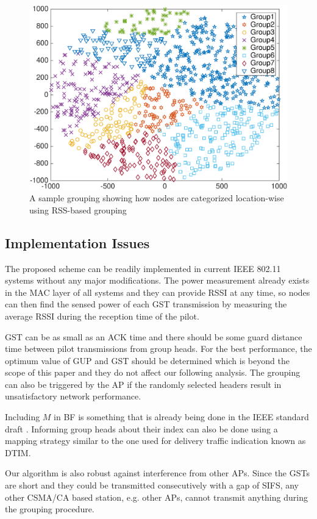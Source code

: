 \begin{figure} [!tbp]
  \centering
  \includegraphics[width=.95\textwidth]{figures/sample_vonoroli}
  \caption{A sample grouping showing how nodes are categorized location-wise using RSS-based grouping}
  \label{fig:samplevonoroli}
\end{figure}


\subsection{Implementation Issues}
The proposed scheme can be readily implemented in current IEEE 802.11 systems without any major modifications. The power measurement already exists in the MAC layer of all systems and they can provide RSSI at any time, so nodes can then find the sensed power of each GST transmission by measuring the average RSSI during the reception time of the pilot. 

GST can be as small as an ACK time and there should be some guard distance time between pilot transmissions from group heads. For the best performance, the optimum value of GUP and GST should be determined which is beyond the scope of this paper and they do not affect our following analysis. The grouping can also be triggered by the AP if the randomly selected headers result in unsatisfactory network performance.

Including $M$ in BF is something that is already being done in the IEEE standard draft \cite{Draft80211ah}. Informing group heads about their index can also be done using a mapping strategy similar to the one used for delivery traffic indication known as DTIM.

Our algorithm is also robust against interference from other APs. Since the GSTs are short and they could be transmitted consecutively with a gap of SIFS, any other CSMA/CA based station, e.g. other APs, cannot transmit anything during the grouping procedure.

